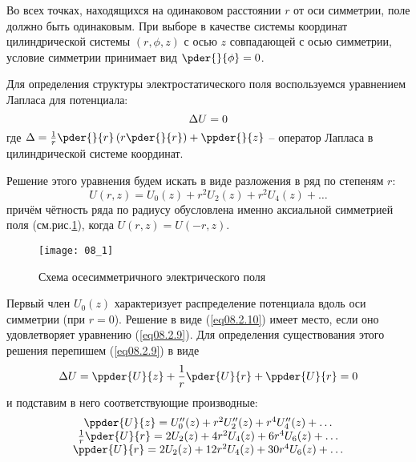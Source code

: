 
Во всех точках, находящихся на одинаковом расстоянии \( r \) от оси симметрии, 
поле должно быть одинаковым. При выборе в качестве системы координат 
цилиндрической системы \( (r, \phi, z ) \) с осью \( z \) совпадающей с осью 
симметрии, условие симметрии принимает вид \( \pder{}{\phi} = 0 \).

Для определения структуры электростатического поля воспользуемся уравнением 
Лапласа для потенциала:
\begin{equation}
	\Delta U = 0
	\label{eq08.2.9}
\end{equation}
где 
\( \D = \frac{1}{r}\pder{}{r}\left( r \pder{}{r} \right) + \ppder{}{z} \) -- 
оператор Лапласа в цилиндрической системе координат.

Решение этого уравнения будем искать в виде разложения в ряд по степеням 
\( r \): 
\begin{equation}
	U(r,z) = U_0 (z) + r^2 U_2 (z) + r^2 U_4 (z) + \ldots
	\label{eq08.2.10}
\end{equation}
причём чётность ряда по радиусу обусловлена именно аксиальной симметрией поля 
(см.рис.\ref{img08.1}), когда \( U(r,z) = U(-r,z) \).

\begin{figure}[h!]
	\center
	\texttt{[image: 08\_1]}
	\caption{Схема осесимметричного электрического поля}
	\label{img08.1}
\end{figure}

Первый член \( U_0 (z) \) характеризует распределение потенциала вдоль оси 
симметрии (при \( r = 0 \)). Решение в виде (\ref{eq08.2.10}) имеет место, 
если оно удовлетворяет уравнению (\ref{eq08.2.9}). Для определения 
существования этого решения перепишем (\ref{eq08.2.9}) в виде
\begin{equation}
	\D U = \ppder{U}{z} + \frac{1}{r}\pder{U}{r} + \ppder{U}{r} = 0
	\label{eq08.2.11}
\end{equation}
и подставим в него соответствующие производные:
\[
	\begin{array}{c}
		\ppder{U}{z} = U_0''(z) + r^2 U_2''(z) + r^4 U_4''(z) + \ldots \\
		\frac{1}{r}\pder{U}{r} = 2U_2(z) + 4r^2U_4(z) + 6r^4U_6(z) + \ldots \\
		\ppder{U}{r} = 2U_2(z) + 12r^2U_4(z) + 30r^4U_6(z) + \ldots
	\end{array}
\]

